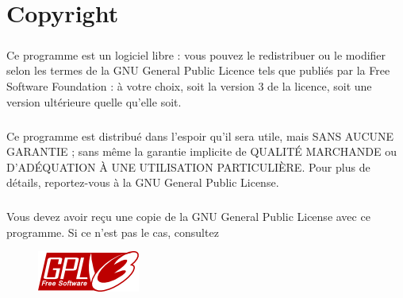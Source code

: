 \chapter{Copyright}
	\paragraph{}
    Ce programme est un logiciel libre : vous pouvez le redistribuer ou
    le modifier selon les termes de la GNU General Public Licence tels
    que publiés par la Free Software Foundation : à votre choix, soit la
    version 3 de la licence, soit une version ultérieure quelle qu'elle
    soit.
	\paragraph{}
    Ce programme est distribué dans l'espoir qu'il sera utile, mais SANS
    AUCUNE GARANTIE ; sans même la garantie implicite de QUALITÉ
    MARCHANDE ou D'ADÉQUATION À UNE UTILISATION PARTICULIÈRE. Pour
    plus de détails, reportez-vous à la GNU General Public License.
	\paragraph	{}
    Vous devez avoir reçu une copie de la GNU General Public License
    avec ce programme. Si ce n'est pas le cas, consultez
 \cite{GNU}   
  \begin{figure}[htbp]
    \centering
    \includegraphics{img/gpl}
  \end{figure}  
